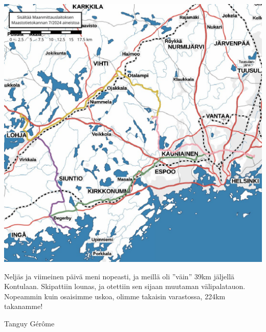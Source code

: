 \begin{multicols}{2}
\begin{center}
	\end{center}
	\columnbreak
	\vspace*{0.32cm}
	\begin{center}
		\noindent\includegraphics[width=1.05\linewidth]{assets/pyörävaellus27}
	\end{center}
	\vspace*{2cm}
	\begin{addmargin}[0.32cm]{0cm}
		{\small
		Neljäs ja viimeinen päivä meni nopeasti, ja meillä oli ''väin'' 39km
		jäljellä Kontulaan.
		Skipattiin lounas, ja otettiin sen sijaan muutaman
		välipalatauon. Nopeammin kuin osaisimme uskoa, olimme takaisin
		varastossa, 224km takanamme!
		}
	\end{addmargin}
\end{multicols}
\vspace*{-0.32cm}


\medskip
\noindent\null\hfill Tanguy Gérôme
